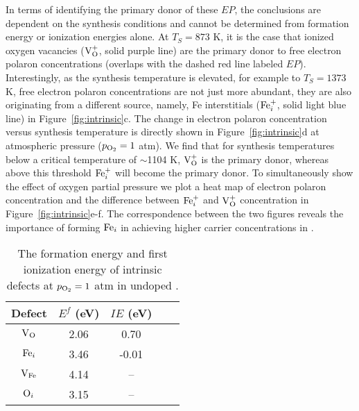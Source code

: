 In terms of identifying the primary donor of these $EP$, the conclusions are dependent on the synthesis conditions and cannot be determined from formation energy or ionization energies alone. At $T_S=873$ K, it is the case that ionized oxygen vacancies ($\text{V}_\text{O}^+$, solid purple line) are the primary donor to free electron polaron concentrations (overlaps with the dashed red line labeled $EP$).
Interestingly, as the synthesis temperature is elevated, for example to $T_S=1373$ K, free electron polaron concentrations are not just more abundant, they are also originating from a different source, namely, Fe interstitials ($\text{Fe}_i^+$, solid light blue line) in Figure~\ref{fig:intrinsic}c.
The change in electron polaron concentration versus synthesis temperature is directly shown in Figure~\ref{fig:intrinsic}d at atmospheric pressure ($p_{\rm O_2}=1$ atm).
We find that for synthesis temperatures below a critical temperature of $\sim$1104 K, $\text{V}_\text{O}^+$ is the primary donor, whereas above this threshold $\text{Fe}_i^+$ will become the primary donor.
To simultaneously show the effect of oxygen partial pressure we plot a heat map of electron polaron concentration and the difference between $\text{Fe}_i^+$ and $\text{V}_\text{O}^+$ concentration in Figure~\ref{fig:intrinsic}e-f. The correspondence between the two figures reveals the importance of forming $\text{Fe}_i$ in achieving higher carrier concentrations in .


\begin{table}[H]
\footnotesize
\centering
\begin{tabular}{c|cccc}
\hline \hline
Defect & $E^f$ (eV) &  $IE$ (eV) \\
\hline
$\text{V}_\text{O}$ &    2.06 &       0.70 \\
$\text{Fe}_i$ &    3.46 &      -0.01 \\
$\text{V}_\text{Fe}$ &    4.14 &       --   \\
$\text{O}_i$ &    3.15 &       --   \\
\hline \hline
\end{tabular}
    \caption{The formation energy and first ionization energy of intrinsic defects at $p_{\rm O_2}=1$ atm in undoped .}
\label{table:intrinsic}
\end{table}

